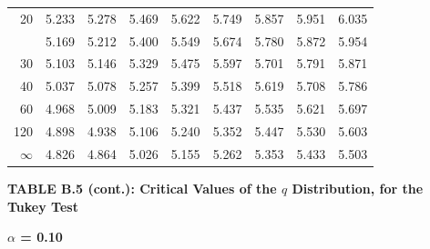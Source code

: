 \documentclass[10pt]{article}
\begin{document}
\begin{longtable}{@{}r!{\vrule width 0.8pt\hspace{0.55em}}rrrrrrrr@{}}
20 & 5.233 & 5.278 & 5.469 & 5.622 & 5.749 & 5.857 & 5.951 & 6.035 \\
 & 5.169 & 5.212 & 5.400 & 5.549 & 5.674 & 5.780 & 5.872 & 5.954 \\
30 & 5.103 & 5.146 & 5.329 & 5.475 & 5.597 & 5.701 & 5.791 & 5.871 \\
40 & 5.037 & 5.078 & 5.257 & 5.399 & 5.518 & 5.619 & 5.708 & 5.786 \\
60 & 4.968 & 5.009 & 5.183 & 5.321 & 5.437 & 5.535 & 5.621 & 5.697 \\
120 & 4.898 & 4.938 & 5.106 & 5.240 & 5.352 & 5.447 & 5.530 & 5.603 \\
\addlinespace[0.30em]
$\infty$ & 4.826 & 4.864 & 5.026 & 5.155 & 5.262 & 5.353 & 5.433 & 5.503 \\
\end{longtable}
\newpage
\thispagestyle{empty}
\begin{center}
{\large\bfseries TABLE B.5 (cont.): Critical Values of the $q$ Distribution, for the Tukey Test\par}
\end{center}
{\large\bfseries $\alpha$ = 0.10\par}
\vspace{0.45em}
\small
\end{document}
